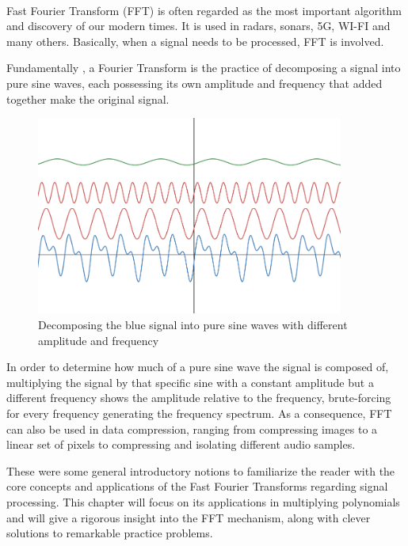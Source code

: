 \documentclass[letterpaper]{article}
\begin{document}
\paragraph{}

Fast Fourier Transform (FFT) is often regarded as the most important algorithm and discovery of our modern times. It is used in radars, sonars, 5G, WI-FI and many others. Basically, when a signal needs to be processed, FFT is involved.

Fundamentally , a Fourier Transform is the practice of decomposing a signal into pure sine waves, each possessing its own amplitude and frequency that added together make the original signal. 

\begin{figure} [h!]
\centering
\includegraphics[width=0.9\textwidth]{pngOfDiagrams/FFT1-signaldecomposition.png}
\caption{Decomposing the blue signal into pure sine waves with different amplitude and frequency}
\end{figure}

In order to determine how much of a pure sine wave the signal is composed of, multiplying the signal by that specific sine with a constant amplitude but a different frequency shows the amplitude relative to the frequency, brute-forcing for every frequency generating the frequency spectrum. As a consequence, FFT can also be used in data compression, ranging from compressing images to a linear set of pixels to compressing and isolating different audio samples.

These were some general introductory notions to familiarize the reader with the core concepts and applications of the Fast Fourier Transforms regarding signal processing. This chapter will focus on its applications in multiplying polynomials and will give a rigorous insight into the FFT mechanism, along with clever solutions to remarkable practice problems. 
\end{document}
